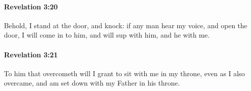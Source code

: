 		\paragraph{Revelation 3:20} %
			\label{REVELATIONNT-3-20}

			Behold, I stand at the door, and knock: if any man hear my voice, and open the door, I will come in to him, and will sup with him, and he with me.

			\begin{framed}
			\scriptsize
				\begin{compactdesc}
					\item[SBLG] 
				\end{compactdesc}
			\end{framed}

		\paragraph{Revelation 3:21} %
			\label{REVELATIONNT-3-21}

			To him that overcometh will I grant to sit with me in my throne, even as I also overcame, and am set down with my Father in his throne.

